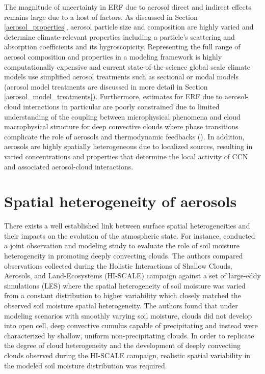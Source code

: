 The magnitude of uncertainty in ERF due to aerosol direct and indirect effects remains large due to a host of factors. As discussed in Section \ref{aerosol_properties}, aerosol particle size and composition are highly varied and determine climate-relevant properties including a particle's scattering and absorption coefficients and its hygroscopicity. Representing the full range of aerosol composition and properties in a modeling framework is highly computationally expensive and current state-of-the-science global scale climate models use simplified aerosol treatments such as sectional or modal models (aerosol model treatments are discussed in more detail in Section \ref{aerosol_model_treatments}). Furthermore, estimates for ERF due to aerosol-cloud interactions in particular are poorly constrained due to limited understanding of the coupling between microphysical phenomena and cloud macrophysical structure for deep convective clouds where phase transitions complicate the role of aerosols and thermodynamic feedbacks (\cite{fan_review_2016}). In addition, aerosols are highly spatially heterogeneous due to localized sources, resulting in varied concentrations and properties that determine the local activity of CCN and associated aerosol-cloud interactions.

\section{Spatial heterogeneity of aerosols}

There exists a well established link between surface spatial heterogeneities and their impacts on the evolution of the atmospheric state. For instance, \cite{fast_impact_2019} conducted a joint observation and modeling study to evaluate the role of soil moisture heterogeneity in promoting deeply convecting clouds. The authors compared observations collected during the Holistic Interactions of Shallow Clouds, Aerosols, and Land-Ecosystems (HI-SCALE) campaign against a set of large-eddy simulations (LES) where the spatial heterogeneity of soil moisture was varied from a constant distribution to higher variability which closely matched the observed soil moisture spatial heterogeneity.  The authors found that under modeling scenarios with smoothly varying soil moisture, clouds did not develop into open cell, deep convective cumulus capable of precipitating and instead were characterized by shallow, uniform non-precipitating clouds. In order to replicate the degree of cloud heterogeneity and the development of deeply convecting clouds observed during the HI-SCALE campaign, realistic spatial variability in the modeled soil moisture distribution was required. 

